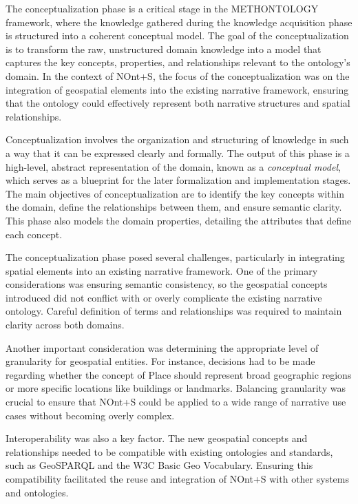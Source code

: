 The conceptualization phase is a critical stage in the METHONTOLOGY framework, where the knowledge gathered during the knowledge acquisition phase is structured into a coherent conceptual model. The goal of the conceptualization is to transform the raw, unstructured domain knowledge into a model that captures the key concepts, properties, and relationships relevant to the ontology's domain. In the context of NOnt+S, the focus of the conceptualization was on the integration of geospatial elements into the existing narrative framework, ensuring that the ontology could effectively represent both narrative structures and spatial relationships.

Conceptualization involves the organization and structuring of knowledge in such a way that it can be expressed clearly and formally. The output of this phase is a high-level, abstract representation of the domain, known as a \textit{conceptual model}, which serves as a blueprint for the later formalization and implementation stages. The main objectives of conceptualization are to identify the key concepts within the domain, define the relationships between them, and ensure semantic clarity. This phase also models the domain properties, detailing the attributes that define each concept.

The conceptualization phase posed several challenges, particularly in integrating spatial elements into an existing narrative framework. One of the primary considerations was ensuring semantic consistency, so the geospatial concepts introduced did not conflict with or overly complicate the existing narrative ontology. Careful definition of terms and relationships was required to maintain clarity across both domains.

Another important consideration was determining the appropriate level of granularity for geospatial entities. For instance, decisions had to be made regarding whether the concept of Place should represent broad geographic regions or more specific locations like buildings or landmarks. Balancing granularity was crucial to ensure that NOnt+S could be applied to a wide range of narrative use cases without becoming overly complex.

Interoperability was also a key factor. The new geospatial concepts and relationships needed to be compatible with existing ontologies and standards, such as GeoSPARQL and the W3C Basic Geo Vocabulary. Ensuring this compatibility facilitated the reuse and integration of NOnt+S with other systems and ontologies.

